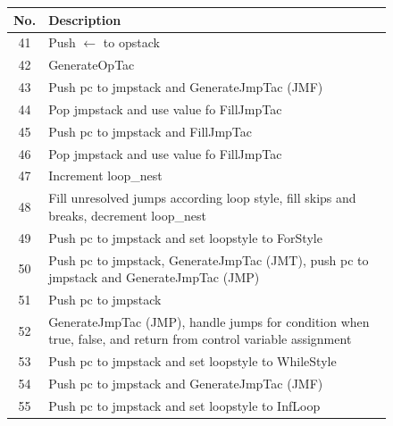 \begin{figure}[H]
    \centering
    \begin{tabular}{cp{3in}}
        \toprule
        \textbf{No.} & \textbf{Description}\\
        \midrule 41 & Push $\leftarrow$ to opstack\\
        \midrule 42 & GenerateOpTac\\
        \midrule 43 & Push pc to jmpstack and GenerateJmpTac (JMF)\\
        \midrule 44 & Pop jmpstack and use value fo FillJmpTac\\
        \midrule 45 & Push pc to jmpstack and FillJmpTac\\
        \midrule 46 & Pop jmpstack and use value fo FillJmpTac\\
        \midrule 47 & Increment loop\_nest\\
        \midrule 48 & Fill unresolved jumps according loop style, fill skips and
        breaks, decrement loop\_nest\\
        \midrule 49 & Push pc to jmpstack and set loopstyle to ForStyle\\
        \midrule 50 & Push pc to jmpstack, GenerateJmpTac (JMT), push pc to 
        jmpstack and GenerateJmpTac (JMP)\\
        \midrule 51 & Push pc to jmpstack\\
        \midrule 52 & GenerateJmpTac (JMP), handle jumps for condition when
        true, false, and return from control variable assignment\\
        \midrule 53 & Push pc to jmpstack and set loopstyle to WhileStyle\\
        \midrule 54 & Push pc to jmpstack and GenerateJmpTac (JMF)\\
        \midrule 55 & Push pc to jmpstack and set loopstyle to InfLoop\\
        \bottomrule
    \end{tabular}
\end{figure}

\newpage

